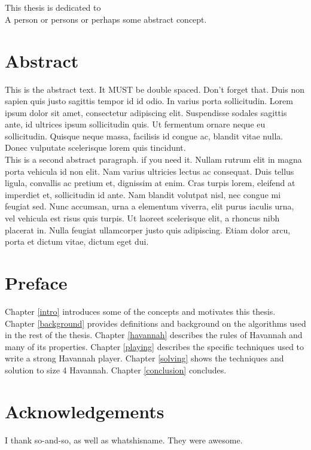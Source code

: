   
   \newpage 
  \chapter*{}
  \thispagestyle{empty}
  This thesis is dedicated to\\
  A person or persons or perhaps some abstract concept.

  \newpage 
  \chapter*{Abstract}
  \thispagestyle{empty}
  \vspace*{-0.7in}
  \renewcommand{\baselinestretch}{1.8}
  \normalsize{
  This is the abstract text. It MUST be double spaced. Don't forget that. Duis non sapien quis justo sagittis tempor id id odio. In varius porta sollicitudin. Lorem ipsum dolor sit amet, consectetur adipiscing elit. Suspendisse sodales sagittis ante, id ultrices ipsum sollicitudin quis. Ut fermentum ornare neque eu sollicitudin. Quisque neque massa, facilisis id congue ac, blandit vitae nulla. Donec vulputate scelerisque lorem quis tincidunt.
  } \vspace*{-0.2in} \\
  
  \normalsize{
  This is a second abstract paragraph. if you need it. Nullam rutrum elit in magna porta vehicula id non elit. Nam varius ultricies lectus ac consequat. Duis tellus ligula, convallis ac pretium et, dignissim at enim. Cras turpis lorem, eleifend at imperdiet et, sollicitudin id ante. Nam blandit volutpat nisl, nec congue mi feugiat sed. Nunc accumsan, urna a elementum viverra, elit purus iaculis urna, vel vehicula est risus quis turpis. Ut laoreet scelerisque elit, a rhoncus nibh placerat in. Nulla feugiat ullamcorper justo quis adipiscing. Etiam dolor arcu, porta et dictum vitae, dictum eget dui.
  }
  \renewcommand{\baselinestretch}{1.33}
  
  \newpage 
  \chapter*{Preface}
  \thispagestyle{empty}
  \vspace*{-0.7in}

Chapter \ref{intro} introduces some of the concepts and motivates this thesis. Chapter \ref{background} provides definitions and background on the algorithms used in the rest of the thesis. Chapter \ref{havannah} describes the rules of Havannah and many of its properties. Chapter \ref{playing} describes the specific techniques used to write a strong Havannah player. Chapter \ref{solving} shows the techniques and solution to size 4 Havannah. Chapter \ref{conclusion} concludes.


  \newpage 
   \chapter*{Acknowledgements}
   \thispagestyle{empty}
   \vspace*{-0.7in}
   \small{
  I thank so-and-so, as well as whatshisname. They were awesome.
  }